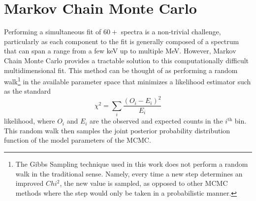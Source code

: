 \section{Markov Chain Monte Carlo}
\label{sec:MCMC}
Performing a simultaneous fit of $60+$ spectra is a non-trivial challenge, particularly as each component to the fit is generally composed of a spectrum that can span a range from a few keV up to multiple MeV. 
However, Markov Chain Monte Carlo provides a tractable solution to this computationally difficult multidimensional fit.
This method can be thought of as performing a random walk\footnote{The Gibbs Sampling technique used in this work does not perform a random walk in the traditional sense.
Namely, every time a new step determines an improved $Chi^2$, the new value is sampled, as opposed to other MCMC methods where the step would only be taken in a probabilistic manner.} in the available parameter space that minimizes a likelihood estimator such as the standard
\begin{equation}
\label{eq:chi_squared}
\chi^2=\sum_i \frac{(O_i-E_i)^2}{E_i}
\end{equation}
likelihood, where $O_i$ and $E_i$ are the observed and expected counts in the $i^{\textrm{th}}$ bin.
This random walk then samples the joint posterior probability distribution function of the model parameters of the MCMC.

